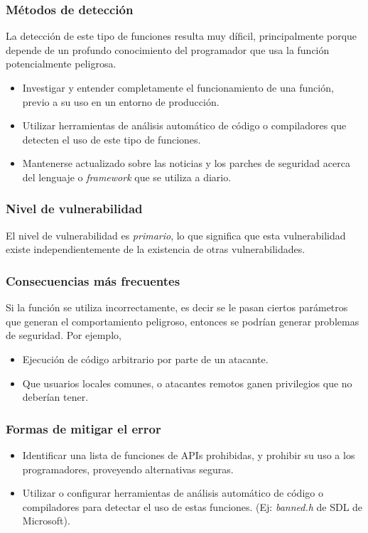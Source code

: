 \subsubsection{Métodos de detección}
La detección de este tipo de funciones resulta muy díficil, principalmente porque depende de un profundo conocimiento del programador que usa la función potencialmente peligrosa.

\begin{itemize}
    \item Investigar y entender completamente el funcionamiento de una función, previo a su uso en un entorno de producción.
    \item Utilizar herramientas de análisis automático de código o compiladores que detecten el uso de este tipo de funciones.
    \item Mantenerse actualizado sobre las noticias y los parches de seguridad acerca del lenguaje o \textit{framework} que se utiliza a diario.
\end{itemize}

\subsubsection{Nivel de vulnerabilidad}

El nivel de vulnerabilidad es \textit{primario}, lo que significa que esta vulnerabilidad existe independientemente de la existencia de otras vulnerabilidades.


\subsubsection{Consecuencias más frecuentes}

Si la función se utiliza incorrectamente, es decir se le pasan ciertos parámetros que generan el comportamiento peligroso, entonces se podrían generar problemas de seguridad.
Por ejemplo,

\begin{itemize}
    \item Ejecución de código arbitrario por parte de un atacante.
    \item Que usuarios locales comunes, o atacantes remotos ganen privilegios que no deberían tener.
\end{itemize}

\subsubsection{Formas de mitigar el error}
\begin{itemize}
   \item Identificar una lista de funciones de APIs prohibidas, y prohibir su uso a los programadores, proveyendo alternativas seguras.
   \item Utilizar o configurar herramientas de análisis automático de código o compiladores para detectar el uso de estas funciones. (Ej: \textit{banned.h} de SDL de Microsoft).
\end{itemize}

